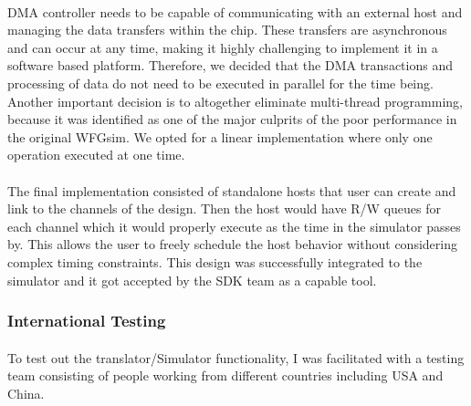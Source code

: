 \paragraph{}
DMA controller needs to be capable of communicating with an external host and managing the data transfers within the chip. These transfers are asynchronous and can occur at any time, making it highly challenging to implement it in a software based platform. Therefore, we decided that the DMA transactions and processing of data do not need to be executed in parallel for the time being. Another important decision is to altogether eliminate multi-thread programming, because it was identified as one of the major culprits of the poor performance in the original WFGsim. We opted for a linear implementation where only one operation executed at one time.

\paragraph{}
The final implementation consisted of standalone hosts that user can create and link to the channels of the design. Then the host would have R/W queues for each channel which it would properly execute as the time in the simulator passes by. This allows the user to freely schedule the host behavior without considering complex timing constraints. This design was successfully integrated to the simulator and it got accepted by the SDK team as a capable tool.

\subsubsection{International Testing}
\paragraph{}
To test out the translator/Simulator functionality, I was facilitated with a testing team consisting of people working from different countries including USA and China.


